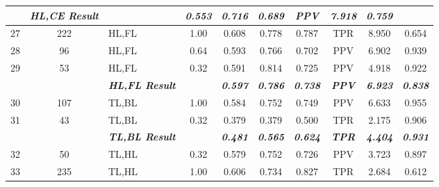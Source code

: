 \begin{table}[H]
{\begin{tabular}{cc|l|c|c|c|c|c|c|c|}
     &
    \textit{\textbf{HL,CE Result}} &
     &
    \textit{\textbf{0.553}} &
    \textit{\textbf{0.716}} &
    \textit{\textbf{0.689}} &
    \textit{\textbf{PPV}} &
    \textit{\textbf{7.918}} &
    \textit{\textbf{0.759}} \\ \hline
  \multicolumn{1}{|c|}{27} &
    222 &
    HL,FL &
    1.00 &
    0.608 &
    0.778 &
    0.787 &
    TPR &
    8.950 &
    0.654 \\ \hline
  \multicolumn{1}{|c|}{28} &
    96 &
    HL,FL &
    0.64 &
    0.593 &
    0.766 &
    0.702 &
    PPV &
    6.902 &
    0.939 \\ \hline
  \multicolumn{1}{|c|}{29} &
    53 &
    HL,FL &
    0.32 &
    0.591 &
    0.814 &
    0.725 &
    PPV &
    4.918 &
    0.922 \\ \hline
   &
     &
    \textit{\textbf{HL,FL Result}} &
     &
    \textit{\textbf{0.597}} &
    \textit{\textbf{0.786}} &
    \textit{\textbf{0.738}} &
    \textit{\textbf{PPV}} &
    \textit{\textbf{6.923}} &
    \textit{\textbf{0.838}} \\ \hline
  \multicolumn{1}{|c|}{30} &
    107 &
    TL,BL &
    1.00 &
    0.584 &
    0.752 &
    0.749 &
    PPV &
    6.633 &
    0.955 \\ \hline
  \multicolumn{1}{|c|}{31} &
    43 &
    TL,BL &
    0.32 &
    0.379 &
    0.379 &
    0.500 &
    TPR &
    2.175 &
    0.906 \\ \hline
   &
     &
    \textit{\textbf{TL,BL Result}} &
     &
    \textit{\textbf{0.481}} &
    \textit{\textbf{0.565}} &
    \textit{\textbf{0.624}} &
    \textit{\textbf{TPR}} &
    \textit{\textbf{4.404}} &
    \textit{\textbf{0.931}} \\ \hline
  \multicolumn{1}{|c|}{32} &
    50 &
    TL,HL &
    0.32 &
    0.579 &
    0.752 &
    0.726 &
    PPV &
    3.723 &
    0.897 \\ \hline
  \multicolumn{1}{|c|}{33} &
    235 &
    TL,HL &
    1.00 &
    0.606 &
    0.734 &
    0.827 &
    TPR &
    2.684 &
    0.612 \\ \hline
  \end{tabular}%
  }
  \end{table}

